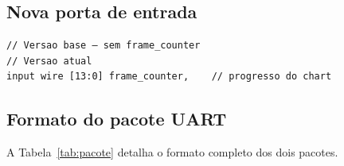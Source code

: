 \documentclass[12pt, a4paper]{article}
\begin{document}
\subsection{Nova porta de entrada}

\begin{lstlisting}[caption={Declaração de porta adicionada ao packet\_sender}]
// Versao base — sem frame_counter
// Versao atual
input wire [13:0] frame_counter,    // progresso do chart
\end{lstlisting}

\subsection{Formato do pacote UART}

A Tabela~\ref{tab:pacote} detalha o formato completo dos dois pacotes.
\end{document}
